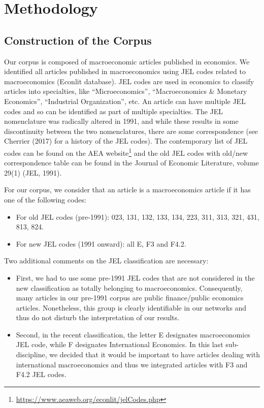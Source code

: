 \documentclass[JEL]{AEA}
\begin{document}
\section{Methodology}

\subsection{Construction of the Corpus}

Our corpus is composed of macroeconomic articles published in economics.
We identified all articles published in macroeconomics using JEL codes
related to macroeconomics (Econlit database). JEL codes are used in
economics to classify articles into specialties, like
``Microeconomics'', ``Macroeconomics \& Monetary Economics'',
``Industrial Organization'', etc. An article can have multiple JEL codes
and so can be identified as part of multiple specialties. The JEL
nomenclature was radically altered in 1991, and while these results in
some discontinuity between the two nomenclatures, there are some
correspondence (see Cherrier (2017) for a history of the JEL codes). The
contemporary list of JEL codes can be found on the AEA
website\footnote{\url{https://www.aeaweb.org/econlit/jelCodes.php}} and
the old JEL codes with old/new correspondence table can be found in the
Journal of Economic Literature, volume 29(1) (JEL, 1991).

For our corpus, we consider that an article is a macroeconomics article
if it has one of the following codes:

\begin{itemize}
\item
  For old JEL codes (pre-1991): 023, 131, 132, 133, 134, 223, 311, 313,
  321, 431, 813, 824.
\item
  For new JEL codes (1991 onward): all E, F3 and F4.2.
\end{itemize}

Two additional comments on the JEL classification are necessary:

\begin{itemize}
\item
  First, we had to use some pre-1991 JEL codes that are not considered
  in the new classification as totally belonging to macroeconomics.
  Consequently, many articles in our pre-1991 corpus are public
  finance/public economics articles. Nonetheless, this group is clearly
  identifiable in our networks and thus do not disturb the
  interpretation of our results.
\item
  Second, in the recent classification, the letter E designates
  macroeconomics JEL code, while F designates International Economics.
  In this last sub-discipline, we decided that it would be important to
  have articles dealing with international macroeconomics and thus we
  integrated articles with F3 and F4.2 JEL codes.
\end{itemize}
\end{document}

